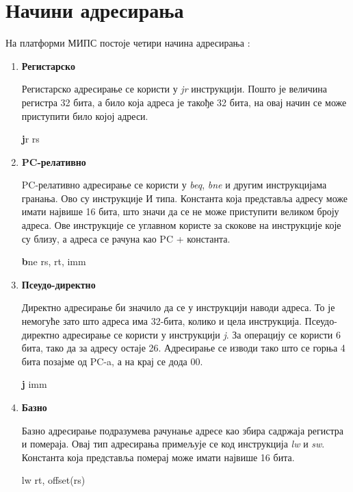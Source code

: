 \documentclass[12pt,oneside]{memoir}
\begin{document}
\section{Начини адресирања}
\label{adresiranje}

На платформи МИПС постоје четири начина адресирања \cite{adresiranje}:

\begin{enumerate}
\item \textbf{Регистарско}

Регистарско адресирање се користи у \textit{jr} инструкцији. Пошто је величина регистра 32 бита, а било која адреса је такође 32 бита, на овај начин се може приступити било којој адреси.
\begin{listing}
\centering
\textbf jr rs
\end{listing}

\item \textbf{PC-релативно}

PC-релативно адресирање се користи у \textit{beq}, \textit{bne} и другим инструкцијама гранања. Ово су инструкције И типа. Константа која представља адресу може имати највише 16 бита, што значи да се не може приступити великом броју адреса. Ове инструкције се углавном користе за скокове на инструкције које су близу, а адреса се рачуна као PC + константа.
\begin{listing}
\centering
\textbf bne rs, rt, imm
\end{listing}

\item \textbf{Псеудо-директно}

Директно адресирање би значило да се у инструкцији наводи адреса. То је немогуће зато што адреса има 32-бита, колико и цела инструкција. Псеудо-директно адресирање се користи у инструкцији \textit{j}. За операцију се користи 6 бита, тако да за адресу остаје 26. Адресирање се изводи тако што се горња 4 бита позајме од PC-a, а на крај се дода 00.

\begin{listing}
\centering
\textbf j imm
\end{listing}

\item \textbf{Базно}

Базно адресирање подразумева рачунање адресе као збира садржаја регистра и помераја. Овај тип адресирања примељује се код инструкција \textit{lw} и \textit{sw}. Константа која представља померај може имати највише 16 бита.

\begin{listing}
lw rt, offset(rs)
\centering
\end{listing}
\end{enumerate}
\end{document}
